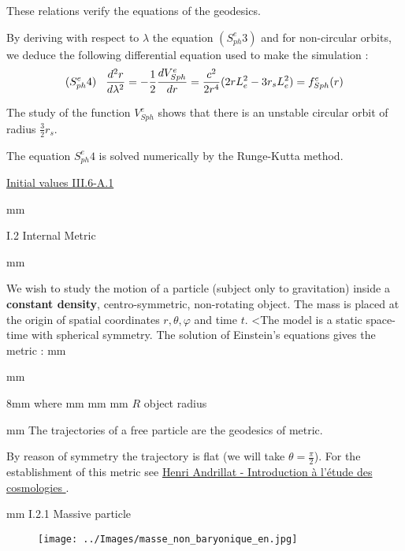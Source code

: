 \documentclass [12pt]{article}
\def\ph#1{\hskip #1}
\def\pv#1{\vskip #1}
\begin{document}
			These relations verify the equations of the geodesics.

		By deriving with respect to $\lambda$ the equation $(S^e_{ph}3)$ and for non-circular orbits, we deduce the following differential equation used to make the simulation :
			$$(S^e_{ph}4)\ph 3mm  \frac{d^2r}{d\lambda^2}= -\frac{1}{2} \frac{dV^e_{Sph}}{dr}=\frac{c^2}{2r^4}(2rL_e^2-3r_sL_e^2)=f^e_{Sph}(r) $$ 


		The study of the function $V^e_{Sph}$ shows that there is an unstable circular orbit of radius $\displaystyle\frac{3}{2}r_s$.  
		
		The equation $S^e_{ph}4$ is solved numerically by the Runge-Kutta method.  
		
		\hyperlink{A1photon} {Initial values III.6-A.1}
      
			\pv 5mm
				
			\hypertarget{ancre03}{{\bidon I.2 Internal Metric}}
     \pv 3mm 
           	
		  
		 We wish to study the motion of a particle (subject only to gravitation) inside a {\bf constant density}, centro-symmetric, non-rotating object. 
			 The mass is placed at the origin of spatial coordinates $r, \theta,\varphi$ and time $t$. 
		<The model is a static space-time with spherical symmetry. 
			 The solution of Einstein's equations gives the metric :  
	\pv 3mm
			  \centerline{}
			\pv 3mm
			 \centerline {  \ph 18mm where \ph 5mm  \ph 5mm \ph 5mm  $ R$ object radius }
			  \pv 3mm					  
                The trajectories of a free particle are the geodesics of metric. 
								
								By reason of symmetry   the trajectory is flat  (we will take $\theta=\displaystyle\frac{\pi}{2}$).
              \pv 1.5mm
			 For the establishment of this metric see \href{./documents/Andrillat.pdf#page=1 }{\textcolor{bleu}{Henri Andrillat - Introduction \`a l'\'etude des cosmologies} }. 
			
			 
	  	\pv 2mm      
	  { I.2.1 Massive particle} 
		
		\begin{figure}[!h]
	   \texttt{[image: ../Images/masse\_non\_baryonique\_en.jpg]}	
	  \end{figure}
		
\end{document}
